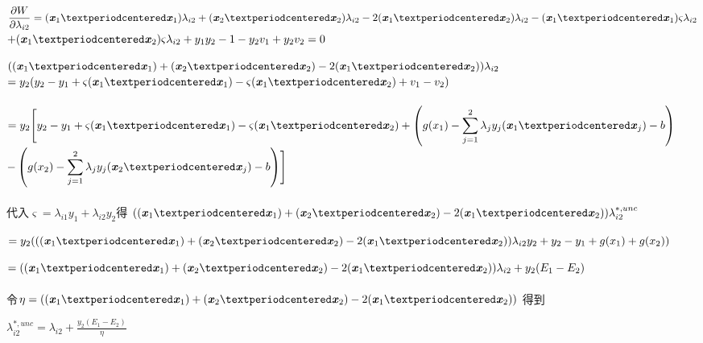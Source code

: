 \documentclass[UTF8]{ctexart}
\begin{document}
\begin{center}

    $\displaystyle{
            \frac{\partial W}{\partial \lambda_{i2}}=
            (\textbf{\emph{x}}_1·\textbf{\emph{x}}_1)
            \lambda_{i2}
            +
            (\textbf{\emph{x}}_2·\textbf{\emph{x}}_2)
            \lambda_{i2}
            -
            2(\textbf{\emph{x}}_1·\textbf{\emph{x}}_2)
            \lambda_{i2}}
        -
        (\textbf{\emph{x}}_1·\textbf{\emph{x}}_1)
        \varsigma \lambda_{i2}
    $
    \\

    $\displaystyle{
            +
            (\textbf{\emph{x}}_1·\textbf{\emph{x}}_2)
            \varsigma \lambda_{i2}
            +y_1y_2-1
            -y_2  v_1
            +y_2  v_2
            =0
        }$

\end{center}
$\displaystyle{
        ((\textbf{\emph{x}}_1·\textbf{\emph{x}}_1)
        +(\textbf{\emph{x}}_2·\textbf{\emph{x}}_2)
        -2(\textbf{\emph{x}}_1·\textbf{\emph{x}}_2)
        )\lambda_{i2}}$
\\
$\displaystyle{
        =y_2(y_2-y_1+\varsigma
        (\textbf{\emph{x}}_1·\textbf{\emph{x}}_1)
        -\varsigma
        (\textbf{\emph{x}}_1·\textbf{\emph{x}}_2)
        +v_1-v_2)}$
\\\quad
\\\quad
$\displaystyle{
    =y_2 \Biggl[
    y_2-y_1+\varsigma
    (\textbf{\emph{x}}_1·\textbf{\emph{x}}_1)
    -\varsigma
    (\textbf{\emph{x}}_1·\textbf{\emph{x}}_2)
    +\left(g(x_1)
    -\sum_{j= 1}^2 \lambda_jy_j(\textbf{\emph{x}}_1·\textbf{\emph{x}}_j)-b\right)
    }$
\\
$\displaystyle{
        -\left(g(x_2)
        -\sum_{j= 1}^2 \lambda_jy_j(\textbf{\emph{x}}_2·\textbf{\emph{x}}_j)-b\right)
        \Biggr]}$
\\
\\
代入$\varsigma =\lambda_{i1}y_1+\lambda_{i2}y_2$得
$\displaystyle{
        ((\textbf{\emph{x}}_1·\textbf{\emph{x}}_1)
        +(\textbf{\emph{x}}_2·\textbf{\emph{x}}_2)
        -2(\textbf{\emph{x}}_1·\textbf{\emph{x}}_2)
        )\lambda_{i2}^{*,unc}}$

$\displaystyle{
        =y_2(((\textbf{\emph{x}}_1·\textbf{\emph{x}}_1)
        +(\textbf{\emph{x}}_2·\textbf{\emph{x}}_2)
        -2(\textbf{\emph{x}}_1·\textbf{\emph{x}}_2)
        )\lambda_{i2}y_2+y_2-y_1+g(x_1)+g(x_2))
    }$

$\displaystyle{
        =((\textbf{\emph{x}}_1·\textbf{\emph{x}}_1)
        +(\textbf{\emph{x}}_2·\textbf{\emph{x}}_2)
        -2(\textbf{\emph{x}}_1·\textbf{\emph{x}}_2)
        )\lambda_{i2}+y_2(E_1-E_2)
    }$
\\
\\
令$\eta =((\textbf{\emph{x}}_1·\textbf{\emph{x}}_1)
    +(\textbf{\emph{x}}_2·\textbf{\emph{x}}_2)
    -2(\textbf{\emph{x}}_1·\textbf{\emph{x}}_2)
    )$
得到
\begin{center}
    $\displaystyle{\lambda_{i2}^{*,unc}=\lambda_{i2}
            +\frac{y_2(E_1-E_2)}{\eta}}$
\end{center}
\end{document}
